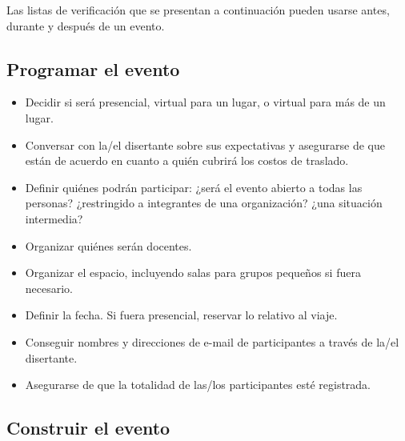 
Las listas de verificación que se presentan a continuación pueden usarse antes, durante y después de un evento.

\subsection*{Programar el evento}

\begin{itemize}

\item
  Decidir si será presencial,
  virtual para un lugar,
  o virtual para más de un lugar.

\item
  Conversar con la/el disertante sobre sus expectativas
  y asegurarse de que están de acuerdo en cuanto a quién cubrirá los costos de traslado.

\item
  Definir quiénes podrán participar:
  ¿será el evento abierto a todas las personas?
  ¿restringido a integrantes de una organización?
  ¿una situación intermedia?

\item
  Organizar quiénes serán docentes.

\item
  Organizar el espacio, incluyendo salas para grupos pequeños si fuera necesario.

\item
  Definir la fecha.
  Si fuera presencial, reservar lo relativo al viaje.

\item
  Conseguir nombres y direcciones de e-mail de participantes a través de la/el disertante.

\item
  Asegurarse de que la totalidad de las/los participantes esté registrada.

\end{itemize}

\subsection*{Construir el evento}

